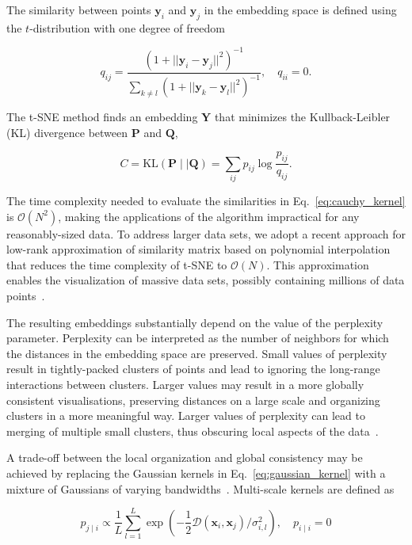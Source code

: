 \documentclass[runningheads]{llncs}
\begin{document}
The similarity between points $\mathbf{y}_i$ and $\mathbf{y}_j$ in the
embedding space is defined using the $t$-distribution with one degree of
freedom

\begin{equation}
q_{ij} = \frac{\left ( 1 + || \mathbf{y}_i - \mathbf{y}_j ||^2 \right )^{-1}}
{\sum_{k \neq l}\left ( 1 + || \mathbf{y}_k - \mathbf{y}_l ||^2 \right )^{-1}},
\quad q_{ii} = 0.
\label{eq:cauchy_kernel}
\end{equation}

The t-SNE method finds an embedding $\mathbf{Y}$ that minimizes
the Kullback-Leibler (KL) divergence between $\mathbf{P}$ and $\mathbf{Q}$,

\begin{equation}
C = \text{KL}(\mathbf{P} \mid \mid \mathbf{Q}) = \sum_{ij} p_{ij} \log \frac{p_{ij}}{q_{ij}}.
\label{eq:kl_divergence}
\end{equation}

The time complexity needed to evaluate the similarities in
Eq.~\ref{eq:cauchy_kernel} is $\mathcal{O}(N^2)$, making the applications of
the algorithm impractical for any reasonably-sized data. To address larger data
sets, we adopt a recent approach for low-rank approximation of
similarity matrix based on polynomial interpolation that reduces the time
complexity of t-SNE to $\mathcal{O}(N)$. This approximation enables the
visualization of massive data sets, possibly containing millions of data
points~\cite{fi_tsne}.

The resulting embeddings substantially depend on the value of the perplexity
parameter. Perplexity can be interpreted as the number of
neighbors for which the distances in the embedding space are preserved. Small
values of perplexity result in tightly-packed clusters of points and lead to
ignoring the long-range interactions between clusters. Larger values may result
in a more globally consistent visualisations, preserving distances on a large
scale and organizing clusters in a more meaningful way. Larger values of
perplexity can lead to merging of multiple small clusters, thus obscuring
local aspects of the data~\cite{art_of_using_tsne}.

A trade-off between the local organization and global consistency may be
achieved by replacing the Gaussian kernels in Eq.~\ref{eq:gaussian_kernel} with
a mixture of Gaussians of varying bandwidths~\cite{multiscale_tsne}.
Multi-scale kernels are defined as

\begin{equation}
p_{j \mid i} \propto \frac{1}{L} \sum_{l=1}^{L} \exp \left ( - \frac{1}{2} \mathcal{D}(\mathbf{x}_i, \mathbf{x}_j ) / \sigma_{i,l}^2 \right ), \quad p_{i \mid i} = 0
\label{eq:multiscale}
\end{equation}
\end{document}
